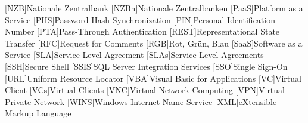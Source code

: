 \begin{acronym}[WHATWG ]
[NZB]{Nationale Zentralbank}
[NZBn]{Nationale Zentralbanken}
[PaaS]{Platform as a Service}
[PHS]{Password Hash Synchronization}
[PIN]{Personal Identification Number}
[PTA]{Pass-Through Authentication}
[REST]{Representational State Transfer}
[RFC]{Request for Comments}
[RGB]{Rot, Grün, Blau}
[SaaS]{Software as a Service}
[SLA]{Service Level Agreement}
[SLAs]{Service Level Agreements}
[SSH]{Secure Shell}
[SSIS]{SQL Server Integration Services}
[SSO]{Single Sign-On}
[URL]{Uniform Resource Locator}
[VBA]{Visual Basic for Applications}
[VC]{Virtual Client}
[VCs]{Virtual Clients}
[VNC]{Virtual Network Computing}
[VPN]{Virtual Private Network}
[WINS]{Windows Internet Name Service}
[XML]{eXtensible Markup Language}
\end{acronym}